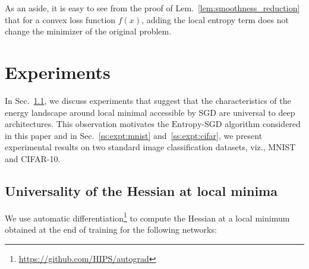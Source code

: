 \documentclass[10pt]{article}
\newcommand{\entropysgd}{\mathrm{Entropy}\textrm{-}\mathrm{SGD}}
\begin{document}
As an aside, it is easy to see from the proof of Lem.~\ref{lem:smoothness_reduction} that for a convex loss function $f(x)$, adding the local entropy term does not change the minimizer of the original problem.

\section{Experiments}
\label{s:expt}

In Sec.~\ref{ss:expt:universality}, we discuss experiments that suggest that the characteristics of the energy landscape around local minimal accessible by SGD are universal to deep architectures.  This observation motivates the $\entropysgd$ algorithm considered in this paper and in Sec.~\ref{ss:expt:mnist} and~\ref{ss:expt:cifar}, we present experimental results on two standard image classification datasets, viz., MNIST and CIFAR-10.

\subsection{Universality of the Hessian at local minima}
\label{ss:expt:universality}

We use automatic differentiation\footnote{\href{https://github.com/HIPS/autograd}{https://github.com/HIPS/autograd}} to compute the Hessian at a local minimum obtained at the end of training for the following networks:
\end{document}
